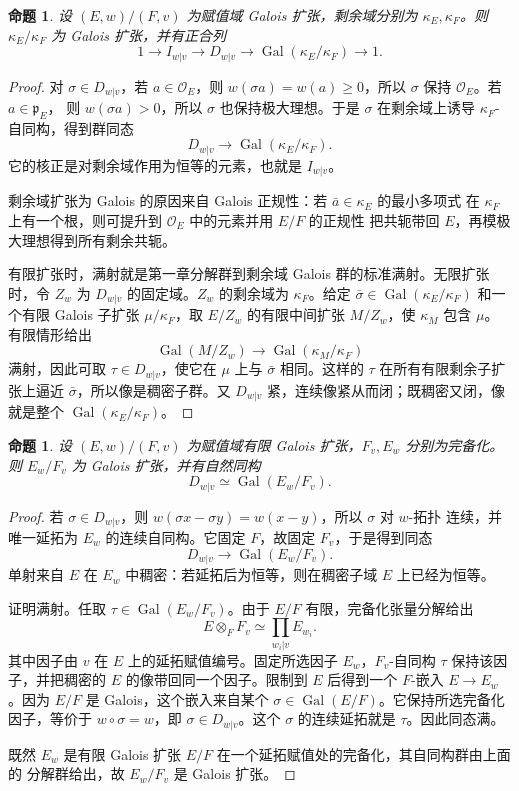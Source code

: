 \documentclass[11pt,a4paper,openany]{ctexbook}
\numberwithin{equation}{chapter}
\newcommand{\Gal}{\operatorname{Gal}}
\theoremstyle{plain}
\newtheorem{proposition}[theorem]{命题}
\theoremstyle{definition}
\theoremstyle{remark}
\begin{document}
\begin{proposition}
设 $(E,w)/(F,v)$ 为赋值域 Galois 扩张，剩余域分别为 $\kappa_E,\kappa_F$。则
$\kappa_E/\kappa_F$ 为 Galois 扩张，并有正合列
\[
1\longrightarrow I_{w|v}\longrightarrow D_{w|v}
\longrightarrow \Gal(\kappa_E/\kappa_F)\longrightarrow1.
\]
\end{proposition}

\begin{proof}
对 $\sigma\in D_{w|v}$，若 $a\in\mathcal O_E$，则
$w(\sigma a)=w(a)\ge0$，所以 $\sigma$ 保持 $\mathcal O_E$。若 $a\in\mathfrak p_E$，
则 $w(\sigma a)>0$，所以 $\sigma$ 也保持极大理想。于是 $\sigma$ 在剩余域上诱导
$\kappa_F$-自同构，得到群同态
\[
D_{w|v}\longrightarrow\Gal(\kappa_E/\kappa_F).
\]
它的核正是对剩余域作用为恒等的元素，也就是 $I_{w|v}$。

剩余域扩张为 Galois 的原因来自 Galois 正规性：若 $\bar a\in\kappa_E$ 的最小多项式
在 $\kappa_F$ 上有一个根，则可提升到 $\mathcal O_E$ 中的元素并用 $E/F$ 的正规性
把共轭带回 $E$，再模极大理想得到所有剩余共轭。

有限扩张时，满射就是第一章分解群到剩余域 Galois 群的标准满射。无限扩张时，令
$Z_w$ 为 $D_{w|v}$ 的固定域。$Z_w$ 的剩余域为 $\kappa_F$。给定
$\bar\sigma\in\Gal(\kappa_E/\kappa_F)$ 和一个有限 Galois 子扩张
$\mu/\kappa_F$，取 $E/Z_w$ 的有限中间扩张 $M/Z_w$，使 $\kappa_M$ 包含 $\mu$。
有限情形给出
\[
\Gal(M/Z_w)\longrightarrow\Gal(\kappa_M/\kappa_F)
\]
满射，因此可取 $\tau\in D_{w|v}$，使它在 $\mu$ 上与 $\bar\sigma$ 相同。这样的
$\tau$ 在所有有限剩余子扩张上逼近 $\bar\sigma$，所以像是稠密子群。又
$D_{w|v}$ 紧，连续像紧从而闭；既稠密又闭，像就是整个
$\Gal(\kappa_E/\kappa_F)$。
\end{proof}

\begin{proposition}
设 $(E,w)/(F,v)$ 为赋值域有限 Galois 扩张，$F_v,E_w$ 分别为完备化。则
$E_w/F_v$ 为 Galois 扩张，并有自然同构
\[
D_{w|v}\simeq\Gal(E_w/F_v).
\]
\end{proposition}

\begin{proof}
若 $\sigma\in D_{w|v}$，则 $w(\sigma x-\sigma y)=w(x-y)$，所以 $\sigma$ 对 $w$-拓扑
连续，并唯一延拓为 $E_w$ 的连续自同构。它固定 $F$，故固定 $F_v$，于是得到同态
\[
D_{w|v}\to\Gal(E_w/F_v).
\]
单射来自 $E$ 在 $E_w$ 中稠密：若延拓后为恒等，则在稠密子域 $E$ 上已经为恒等。

证明满射。任取 $\tau\in\Gal(E_w/F_v)$。由于 $E/F$ 有限，完备化张量分解给出
\[
E\otimes_FF_v\simeq\prod_{w_i|v}E_{w_i}.
\]
其中因子由 $v$ 在 $E$ 上的延拓赋值编号。固定所选因子 $E_w$，$F_v$-自同构
$\tau$ 保持该因子，并把稠密的 $E$ 的像带回同一个因子。限制到 $E$ 后得到一个
$F$-嵌入 $E\to E_w$。因为 $E/F$ 是 Galois，这个嵌入来自某个
$\sigma\in\Gal(E/F)$。它保持所选完备化因子，等价于 $w\circ\sigma=w$，即
$\sigma\in D_{w|v}$。这个 $\sigma$ 的连续延拓就是 $\tau$。因此同态满。

既然 $E_w$ 是有限 Galois 扩张 $E/F$ 在一个延拓赋值处的完备化，其自同构群由上面的
分解群给出，故 $E_w/F_v$ 是 Galois 扩张。
\end{proof}
\end{document}
